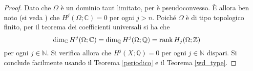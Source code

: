 \begin{proof}
    Dato che $\Omega$ è un dominio taut limitato, per \cite[Theorem F]{W} è pseudoconvesso. È allora ben noto (si veda \cite[Chapter IV, Paragraph 4.2, Theorema 4.2.7]{H}) che $H^j(\Omega;\mathbb{C})=0$ per ogni $j>n$. Poiché $\Omega$ è di tipo topologico finito, per il teorema dei coefficienti universali si ha che
    $$\dim_{\mathbb{C}}{H^j(\Omega;\mathbb{C})}=\dim_{\mathbb{Q}}{H^j(\Omega;\mathbb{Q})}=\operatorname{rank}{H_j(\Omega;\mathbb{Z})}$$
    per ogni $j\in\mathbb{N}$. Si verifica allora che $H^j(X;\mathbb{Q})=0$ per ogni $j\in\mathbb{N}$ dispari. Si conclude facilmente usando il Teorema \ref{periodico} e il Teorema \ref{wd_type}.
\end{proof}